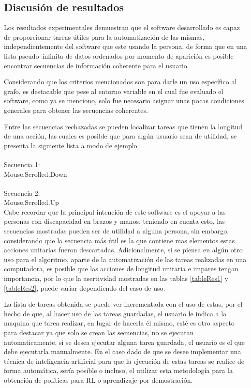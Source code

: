 \subsection{Discusi\'{o}n de resultados}


Los resultados experimentales demuestran que el software desarrollado es capaz
 de proporcionar tareas \'utiles para la automatizaci\'on de las mismas,
 independientemente del software que este usando la persona, de forma que en 
 una lista pseudo--infinita de datos ordenados por momento de aparici\'on es
 posible encontrar secuencias de informaci\'on coherente para el usuario.


Considerando que los criterios mencionados son para darle un uso espec\'ifico
 al grafo, es destacable que pese al entorno variable en el cual fue evaluado
 el software, como ya se menciono, solo fue necesario asignar unas pocas
 condiciones generales para obtener las secuencias coherentes.


Entre las secuencias rechazadas se pueden localizar tareas que tienen la
 longitud de una acci\'on, las cuales es posible que para alg\'un usuario sean
 de utilidad, se presenta la siguiente lista a modo de ejemplo.
\\
\\
Secuencia 1:\\
Mouse,Scrolled,Down\\
\\
Secuencia 2:\\
Mouse,Scrolled,Up\\

Cabe recordar que la principal intenci\'on de este software es el apoyar a las
 personas con discapacidad en brazos y manos, teniendo en cuenta esto, las
 secuencias mostradas pueden ser de utilidad a alguna persona, sin embargo,
 considerando que la secuencia m\'as \'util es la que contiene mas elementos
 estas acciones unitarias fueron descartadas. Adicionalmente, si se piensa en
 alg\'un otro uso para el algoritmo, aparte de la automatizaci\'on de las
 tareas realizadas en una computadora, es posible que las acciones de longitud
 unitaria e impares tengan importancia, por lo que la asertividad mostradas en
 las tablas \ref{tableRes1} y \ref{tableRes2}, puede variar dependiendo del
 caso de uso.

La lista de tareas obtenida se puede ver incrementada con el uso de estas, por 
 el hecho de que, al hacer uso de las tareas guardadas, el usuario le indica a 
 la maquina que tarea realizar, en lugar de hacerla \'el mismo, est\'e es otro 
 aspecto para destacar ya que solo se crean las secuencias, no se ejecutan 
 automaticamente, si se desea ejecutar alguna tarea guardada, el usuario es el 
 que debe ejecutarla manualmente. En el caso dado de que se desee implementar 
 una t\'ecnica de inteligencia artificial para que la ejecuci\'on de estas 
 tareas se realice de forma autom\'atica, ser\'ia posible o incluso, el 
 utilizar esta metodolog\'ia para la obtenci\'on de pol\'iticas para RL o 
 aprendizaje por demostraci\'on.


